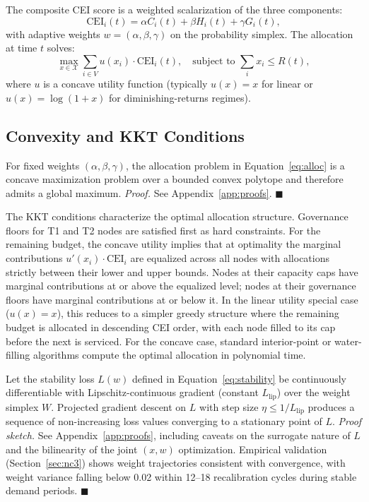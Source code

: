 \documentclass[runningheads]{llncs}
\begin{document}
The composite CEI score is a weighted scalarization of the three components:
\begin{equation}
\text{CEI}_i(t) = \alpha C_i(t) + \beta H_i(t) + \gamma G_i(t),
\label{eq:cei}
\end{equation}
with adaptive weights $w = (\alpha, \beta, \gamma)$ on the probability simplex. The allocation at time $t$ solves:
\begin{equation}
\max_{x \in \mathcal{X}} \sum_{i \in V} u(x_i) \cdot \text{CEI}_i(t), \quad \text{subject to } \sum_i x_i \leq R(t),
\label{eq:alloc}
\end{equation}
where $u$ is a concave utility function (typically $u(x) = x$ for linear or $u(x) = \log(1+x)$ for diminishing-returns regimes).

\subsection{Convexity and KKT Conditions}

\begin{proposition}[Convexity]
For fixed weights $(\alpha, \beta, \gamma)$, the allocation problem in Equation~\ref{eq:alloc} is a concave maximization problem over a bounded convex polytope and therefore admits a global maximum. \emph{Proof.} See Appendix~\ref{app:proofs}. $\blacksquare$
\end{proposition}

The KKT conditions characterize the optimal allocation structure. Governance floors for T1 and T2 nodes are satisfied first as hard constraints. For the remaining budget, the concave utility implies that at optimality the marginal contributions $u'(x_i) \cdot \text{CEI}_i$ are equalized across all nodes with allocations strictly between their lower and upper bounds. Nodes at their capacity caps have marginal contributions at or above the equalized level; nodes at their governance floors have marginal contributions at or below it. In the linear utility special case ($u(x) = x$), this reduces to a simpler greedy structure where the remaining budget is allocated in descending CEI order, with each node filled to its cap before the next is serviced. For the concave case, standard interior-point or water-filling algorithms compute the optimal allocation in polynomial time.

\begin{proposition}
Let the stability loss $L(w)$ defined in Equation~\ref{eq:stability} be continuously differentiable with Lipschitz-continuous gradient (constant $L_{\text{lip}}$) over the weight simplex $W$. Projected gradient descent on $L$ with step size $\eta \leq 1/L_{\text{lip}}$ produces a sequence of non-increasing loss values converging to a stationary point of $L$. \emph{Proof sketch.} See Appendix~\ref{app:proofs}, including caveats on the surrogate nature of $L$ and the bilinearity of the joint $(x, w)$ optimization. Empirical validation (Section~\ref{sec:nc3}) shows weight trajectories consistent with convergence, with weight variance falling below 0.02 within 12--18 recalibration cycles during stable demand periods. $\blacksquare$
\end{proposition}
\end{document}
